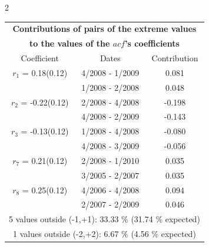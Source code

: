 
\thispagestyle{empty}
\begin{multicols}{2}{ 
\begin{tabular}{ccc}
\multicolumn{3}{c}{\textbf{Contributions of pairs of the extreme values} }  \vspace{-.10in}  \\ 
\multicolumn{3}{c}{ \textbf{to the values of the $acf$'s coefficients}} \\ 
\hline 
\hline                  Coefficient  &  Dates &  Contribution \\ 
\hline 
  $r_{ 1}$ = 0.18(0.12) &       4/2008 -  1/2009 &        0.081   \vspace{-.10in} \\  
&        1/2008 -  2/2008 &        0.048  \vspace{-.02in} \\ \hline 
  $r_{ 2}$ = -0.22(0.12) &       2/2008 -  4/2008 &       -0.198    \vspace{-.10in} \\ 
  &        4/2008 -  2/2009 &       -0.143  \vspace{-.02in}   \\ \hline 
    $r_{ 3}$ = -0.13(0.12) &       1/2008 -  4/2008 &       -0.080    \vspace{-.10in} \\ 
  &        4/2008 -  3/2009 &       -0.056  \vspace{-.02in}   \\ \hline 
    $r_{ 7}$ = 0.21(0.12) &       2/2008 -  1/2010 &        0.035   \vspace{-.10in} \\  
&        3/2005 -  2/2007 &        0.035  \vspace{-.02in} \\ \hline 
  $r_{ 8}$ = 0.25(0.12) &       4/2006 -  4/2008 &        0.094   \vspace{-.10in} \\  
&        2/2007 -  2/2009 &        0.046  \vspace{-.02in} \\ \hline 
\multicolumn{3}{c}{               5 values outside (-1,+1): 33.33  \% (31.74  \% expected)}\vspace{-.10in} \\ 
\multicolumn{3}{c}{               1 values outside (-2,+2):  6.67 \%  (4.56 \% expected) } \\
 \end{tabular} \\ 
 } 
\end{multicols} 
